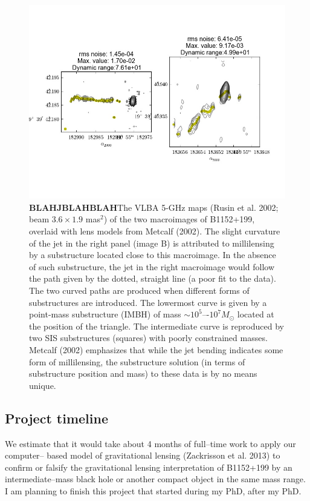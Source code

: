 \documentclass[a4paper, 11pt]{article}
\begin{document}
\begin{figure}[tbh]
\centering
\includegraphics[scale=0.5]{figure2tmp.jpg}
\caption{{\bf  BLAHJBLAHBLAH}The VLBA 5-GHz maps (Rusin et al. 2002; beam $3.6 \times 1.9$ mas$^2$) of the two macroimages of B1152+199, overlaid with lens models from Metcalf (2002). The slight curvature of the jet in the right panel (image B) is attributed to millilensing by a substructure located close to this macroimage. In the absence of such substructure, the jet in the right macroimage would follow the path given by the dotted, straight line (a poor fit to the data). The two curved paths are produced when different forms of substructures are introduced. The lowermost curve is given by a point-mass substructure (IMBH) of mass $\sim 10^5$–-$10^7 M_\odot$ located at the position of the triangle. The intermediate curve is reproduced by two SIS substructures (squares) with poorly constrained masses. Metcalf (2002) emphasizes that while the jet bending indicates some form of millilensing, the substructure solution (in terms of substructure position and mass) to these data is by no means unique.}
\end{figure}


\subsection{Project timeline}
We estimate that it would take about 4 months of full--time work to apply our computer-- based model of gravitational lensing (Zackrisson et al. 2013) to confirm or falsify the gravitational lensing interpretation of B1152+199 by an intermediate--mass black hole or another compact object in the same mass range. I am planning to finish this project that started during my PhD, after my PhD.
\end{document}

